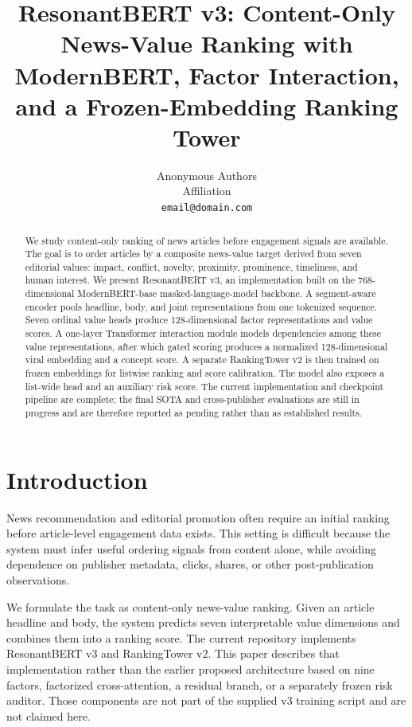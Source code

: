 \documentclass[11pt]{article}
\title{ResonantBERT v3: Content-Only News-Value Ranking with\newline
ModernBERT, Factor Interaction, and a Frozen-Embedding Ranking Tower}
\author{
Anonymous Authors \\
Affiliation \\
\texttt{email@domain.com}
}
\begin{document}
\maketitle

\begin{abstract}
We study content-only ranking of news articles before engagement signals are available. The goal is to order articles by a composite news-value target derived from seven editorial values: impact, conflict, novelty, proximity, prominence, timeliness, and human interest. We present ResonantBERT v3, an implementation built on the 768-dimensional ModernBERT-base masked-language-model backbone. A segment-aware encoder pools headline, body, and joint representations from one tokenized sequence. Seven ordinal value heads produce 128-dimensional factor representations and value scores. A one-layer Transformer interaction module models dependencies among these value representations, after which gated scoring produces a normalized 128-dimensional viral embedding and a concept score. A separate RankingTower v2 is then trained on frozen embeddings for listwise ranking and score calibration. The model also exposes a list-wide head and an auxiliary risk score. The current implementation and checkpoint pipeline are complete; the final SOTA and cross-publisher evaluations are still in progress and are therefore reported as pending rather than as established results.
\end{abstract}

\section{Introduction}

News recommendation and editorial promotion often require an initial ranking before article-level engagement data exists. This setting is difficult because the system must infer useful ordering signals from content alone, while avoiding dependence on publisher metadata, clicks, shares, or other post-publication observations.

We formulate the task as content-only news-value ranking. Given an article headline and body, the system predicts seven interpretable value dimensions and combines them into a ranking score. The current repository implements ResonantBERT v3 and RankingTower v2. This paper describes that implementation rather than the earlier proposed architecture based on nine factors, factorized cross-attention, a residual branch, or a separately frozen risk auditor. Those components are not part of the supplied v3 training script and are not claimed here.
\end{document}

